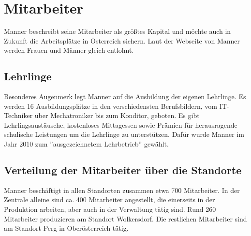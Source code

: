 \section{Mitarbeiter}
Manner beschreibt seine Mitarbeiter als größtes Kapital und möchte auch in Zukunft die Arbeitsplätze in Österreich sichern.
Laut der Webseite von Manner werden Frauen und Männer gleich entlohnt.\cite{josef_manner_unternehmen}

\subsection{Lehrlinge}
Besonderes Augenmerk legt Manner auf die Ausbildung der eigenen Lehrlinge. Es werden 16 Ausbildungsplätze in den verschiedensten Berufsbildern, vom IT-Techniker über Mechatroniker bis zum Konditor, geboten. Es gibt Lehrlingsaustäusche, kostenloses Mittagessen sowie Prämien für herausragende schulische Leistungen um die Lehrlinge zu unterstützen. Dafür wurde Manner im Jahr 2010 zum ''ausgezeichnetem Lehrbetrieb'' gewählt.\cite{josef_manner_unternehmen}

\subsection{Verteilung der Mitarbeiter über die Standorte}
Manner beschäftigt in allen Standorten zusammen etwa 700 Mitarbeiter. In der Zentrale alleine sind ca. 400 Mitarbeiter angestellt, die einerseits in der Produktion arbeiten, aber auch in der Verwaltung tätig sind. Rund 260 Mitarbeiter produzieren am Standort Wolkersdorf. Die restlichen Mitarbeiter sind am Standort Perg in Oberösterreich tätig.\cite{josef_manner_unternehmen}

